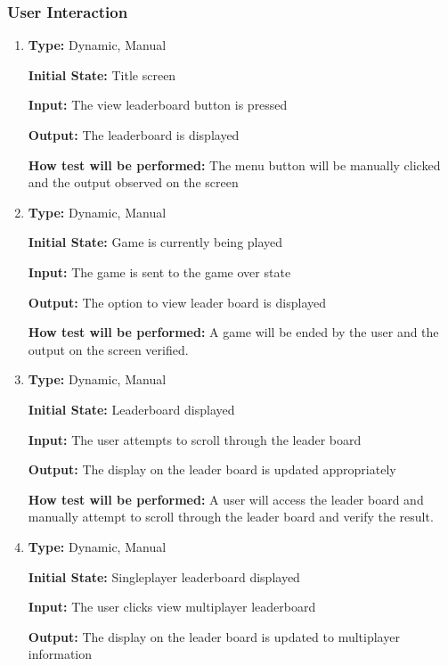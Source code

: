\documentclass[12pt, titlepage]{article}
\begin{document}
	\subsubsection{User Interaction}
	\begin{enumerate}[{FR-UI-}1. ]
		\item
		\textbf{Type:} Dynamic, Manual
		
		\textbf{Initial State:} Title screen
		
		\textbf{Input:} The view leaderboard button is pressed
		
		\textbf{Output:} The leaderboard is displayed
		
		\textbf{How test will be performed:} The menu button will be manually clicked and the output observed on the screen
		
		\item
		\textbf{Type:} Dynamic, Manual
		
		\textbf{Initial State:} Game is currently being played
		
		\textbf{Input:} The game is sent to the game over state
		
		\textbf{Output:} The option to view leader board is displayed
		
		\textbf{How test will be performed:} A game will be ended by the user and the output on the screen verified.
		
		\item
		
		\textbf{Type:} Dynamic, Manual
		
		\textbf{Initial State:} Leaderboard displayed
		
		\textbf{Input:} The user attempts to scroll through the leader board
		
		\textbf{Output:} The display on the leader board is updated appropriately
		
		\textbf{How test will be performed:} A user will access the leader board and manually attempt to scroll through the leader board and verify the result.
		
		\item
		
		\textbf{Type:} Dynamic, Manual
		
		\textbf{Initial State:} Singleplayer leaderboard displayed
		
		\textbf{Input:} The user clicks view multiplayer leaderboard
		
		\textbf{Output:} The display on the leader board is updated to multiplayer information
		

\end{enumerate}
\end{document}
